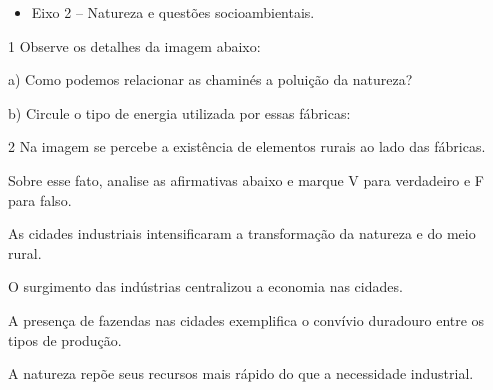 
\begin{itemize}
\item Eixo 2 -- Natureza e questões socioambientais.
\end{itemize}

\num{1} Observe os detalhes da imagem abaixo:

%


\num{a)} Como podemos relacionar as chaminés a poluição da natureza?



\num{b)} Circule o tipo de energia utilizada por essas fábricas:

\begin{multicols}{2}




\end{multicols}


\num{2} Na imagem se percebe a existência de elementos rurais ao lado das fábricas.

Sobre esse fato, analise as afirmativas abaixo e marque V para verdadeiro e F para falso.

\begin{boxlist}
\item As cidades industriais intensificaram a transformação da natureza e
do meio rural. 

\item O surgimento das indústrias centralizou a economia nas cidades. 

\item A presença de fazendas nas cidades exemplifica o convívio duradouro
entre os tipos de produção. 

\item A natureza repõe seus recursos mais rápido do que a necessidade
industrial. 
\end{boxlist}

